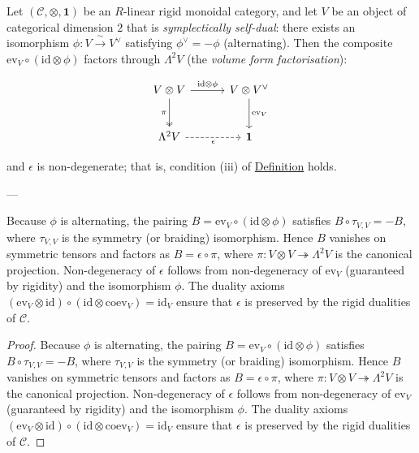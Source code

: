 \begin{lemma}
  \label{lem:volume-from-rigidity}
Let $(\mathcal{C}, \otimes, \mathbf{1})$ be an $R$-linear rigid monoidal
category, and let $V$ be an object of categorical dimension $2$ that is
\emph{symplectically self-dual}: there exists an isomorphism
$\phi \colon V \xrightarrow{\;\sim\;} V^{\vee}$ satisfying
$\phi^{\vee} = -\phi$ (alternating). Then the composite
$\mathrm{ev}_V \circ (\mathrm{id} \otimes \phi)$ factors through
$\Lambda^2 V$ (the \emph{volume form factorisation}):

\begin{equation}\label{eq:volume-form-factorisation}
\begin{tikzcd}[row sep=2.5em, column sep=3em]
  V \otimes V
    \ar[r, "\mathrm{id} \otimes \phi"]
    \ar[d, "\pi"', two heads]
  & V \otimes V^{\vee}
    \ar[d, "\mathrm{ev}_V"]
  \\
  \Lambda^2 V
    \ar[r, "\epsilon"', dashed]
  & \mathbf{1}
\end{tikzcd}
\end{equation}

and $\epsilon$ is non-degenerate; that is,
condition (iii) of
\hyperref[def:quantum-observable-universe]{Definition} holds.

---

Because $\phi$ is alternating, the pairing
$B = \mathrm{ev}_V \circ (\mathrm{id} \otimes \phi)$ satisfies
$B \circ \tau_{V,V} = -B$, where $\tau_{V,V}$ is the symmetry (or
braiding) isomorphism. Hence $B$ vanishes on symmetric tensors and
factors as $B = \epsilon \circ \pi$, where
$\pi \colon V \otimes V \twoheadrightarrow \Lambda^2 V$ is the
canonical projection. Non-degeneracy of $\epsilon$ follows from
non-degeneracy of $\mathrm{ev}_V$ (guaranteed by rigidity) and the
isomorphism $\phi$. The duality axioms
$(\mathrm{ev}_V \otimes \mathrm{id}) \circ
(\mathrm{id} \otimes \mathrm{coev}_V) = \mathrm{id}_V$ ensure that
$\epsilon$ is preserved by the rigid dualities of $\mathcal{C}$.
\end{lemma}
\begin{proof}
Because $\phi$ is alternating, the pairing
$B = \mathrm{ev}_V \circ (\mathrm{id} \otimes \phi)$ satisfies
$B \circ \tau_{V,V} = -B$, where $\tau_{V,V}$ is the symmetry (or
braiding) isomorphism. Hence $B$ vanishes on symmetric tensors and
factors as $B = \epsilon \circ \pi$, where
$\pi \colon V \otimes V \twoheadrightarrow \Lambda^2 V$ is the
canonical projection. Non-degeneracy of $\epsilon$ follows from
non-degeneracy of $\mathrm{ev}_V$ (guaranteed by rigidity) and the
isomorphism $\phi$. The duality axioms
$(\mathrm{ev}_V \otimes \mathrm{id}) \circ
(\mathrm{id} \otimes \mathrm{coev}_V) = \mathrm{id}_V$ ensure that
$\epsilon$ is preserved by the rigid dualities of $\mathcal{C}$.
\end{proof}

